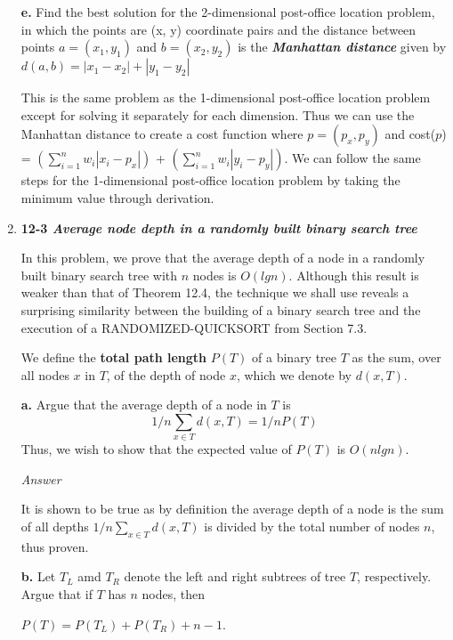 \documentclass{article}
\begin{document}
\begin{enumerate}
\newpage

\subitem \textbf{e.} Find the best solution for the 2-dimensional post-office location problem, in which the points are (x, y) coordinate pairs and the distance between points $a = (x_1, y_1)$ and $b = (x_2, y_2)$ is the \textbf{\textit{Manhattan distance}} given by $d(a, b) = |x_1 - x_2| + |y_1 - y_2|$

This is the same problem as the 1-dimensional post-office location problem except for solving it separately for each dimension. Thus we can use the Manhattan distance to create a cost function where $p = (p_x, p_y)$ and cost($p$) = $(\sum_{i = 1}^{n} w_i |x_i - p_x|)$ + $(\sum_{i = 1}^{n} w_i |y_i - p_y|)$. We can follow the same steps for the 1-dimensional post-office location problem by taking the minimum value through derivation.

\newpage

\item \textbf{12-3 \textit{Average node depth in a randomly built binary search tree}}

In this problem, we prove that the average depth of a node in a randomly built binary search tree with $n$ nodes is $O(lgn)$. Although this result is weaker than that of Theorem 12.4, the technique we shall use reveals a surprising similarity between the building of a binary search tree and the execution of a RANDOMIZED-QUICKSORT from Section 7.3.
	
\hspace{10mm} We define the \textbf{total path length} $P(T)$ of a binary tree $T$ as the sum, over all nodes $x$ in $T$, of the depth of node $x$, which we denote by $d(x, T)$.

\subitem \textbf{a.} Argue that the average depth of a node in $T$ is $$1/n \sum_{x \in T} d(x, T) = 1/n P(T)$$ \hspace{11mm}Thus, we wish to show that the expected value of $P(T)$ is $O(nlgn)$. 

{\textit{Answer}} 

It is shown to be true as by definition the average depth of a node is the sum of all depths $1/n \sum_{x \in T} d(x, T)$ is divided by the total number of nodes $n$, thus proven.

\newpage

\subitem \textbf{b.} Let $T_L$ amd $T_R$ denote the left and right subtrees of tree $T$, respectively. Argue that if $T$ has $n$ nodes, then 

$P(T) = P(T_L) + P(T_R) + n - 1$. 


\end{enumerate}
\end{document}
